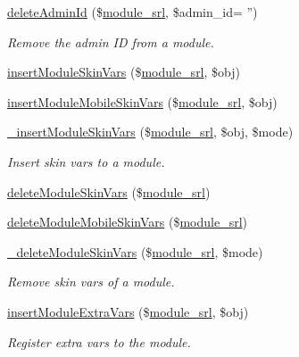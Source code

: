 \begin{DoxyCompactItemize}
\hyperlink{classmoduleController_a3ba07d8a726a5f1d869480fa61a60487}{delete\-Admin\-Id} (\$\hyperlink{ko_8install_8php_a370bb6450fab1da3e0ed9f484a38b761}{module\-\_\-srl}, \$admin\-\_\-id= '')
\begin{DoxyCompactList}\small\item\em Remove the admin I\-D from a module. \end{DoxyCompactList}\item 
\hyperlink{classmoduleController_ad044df4dde2053b5dcbaf5077822290c}{insert\-Module\-Skin\-Vars} (\$\hyperlink{ko_8install_8php_a370bb6450fab1da3e0ed9f484a38b761}{module\-\_\-srl}, \$obj)
\item 
\hyperlink{classmoduleController_a6c7aab59734028d1c980053a75437a45}{insert\-Module\-Mobile\-Skin\-Vars} (\$\hyperlink{ko_8install_8php_a370bb6450fab1da3e0ed9f484a38b761}{module\-\_\-srl}, \$obj)
\item 
\hyperlink{classmoduleController_aea2dfb4f6a1d31acdbebf131058494cd}{\-\_\-insert\-Module\-Skin\-Vars} (\$\hyperlink{ko_8install_8php_a370bb6450fab1da3e0ed9f484a38b761}{module\-\_\-srl}, \$obj, \$mode)
\begin{DoxyCompactList}\small\item\em Insert skin vars to a module. \end{DoxyCompactList}\item 
\hyperlink{classmoduleController_ad85915b5cf2a31804f673cfc3320ac75}{delete\-Module\-Skin\-Vars} (\$\hyperlink{ko_8install_8php_a370bb6450fab1da3e0ed9f484a38b761}{module\-\_\-srl})
\item 
\hyperlink{classmoduleController_a16feed706aef2613cc417c68cb06ba8a}{delete\-Module\-Mobile\-Skin\-Vars} (\$\hyperlink{ko_8install_8php_a370bb6450fab1da3e0ed9f484a38b761}{module\-\_\-srl})
\item 
\hyperlink{classmoduleController_a88baeaa3755f270af223e17e7a96d20a}{\-\_\-delete\-Module\-Skin\-Vars} (\$\hyperlink{ko_8install_8php_a370bb6450fab1da3e0ed9f484a38b761}{module\-\_\-srl}, \$mode)
\begin{DoxyCompactList}\small\item\em Remove skin vars of a module. \end{DoxyCompactList}\item 
\hyperlink{classmoduleController_a1a8373bfcd3e1e8bc88f41bb777ad486}{insert\-Module\-Extra\-Vars} (\$\hyperlink{ko_8install_8php_a370bb6450fab1da3e0ed9f484a38b761}{module\-\_\-srl}, \$obj)
\begin{DoxyCompactList}\small\item\em Register extra vars to the module. \end{DoxyCompactList}\item 

\end{DoxyCompactItemize}
